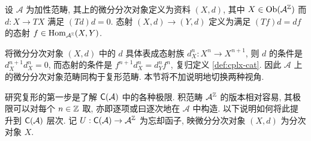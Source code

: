 \begin{definition}[微分分次对象]
	设 $\mathcal{A}$ 为加性范畴, 其上的微分分次对象定义为资料 $(X, d)$, 其中 $X \in \operatorname{Ob}(\mathcal{A}^{\mathbb{Z}})$ 而 $d: X \to TX$ 满足 $(Td)d = 0$. 态射 $(X,d) \to (Y,d)$ 定义为满足 $(Tf) d = df$ 的态射 $f \in \operatorname{Hom}_{\mathcal{A}^{\mathbb{Z}}}(X, Y)$.
\end{definition}

将微分分次对象 $(X, d)$ 中的 $d$ 具体表成态射族 $d_X^n: X^n \to X^{n+1}$, 则 $d$ 的条件是 $d_X^{n+1} d_X^n = 0$, 而态射的条件是 $f^{n+1} d^n_X = d^n_Y f^n$, 复归定义 \ref{def:cplx-cat}. 因此 $\mathcal{A}$ 上的微分分次对象范畴同构于复形范畴. 本节将不加说明地切换两种视角.

研究复形的第一步是了解 $\mathsf{C}(\mathcal{A})$ 中的各种极限. 积范畴 $\mathcal{A}^{\mathbb{Z}}$ 的版本相对容易, 其极限可以对每个 $n \in \mathbb{Z}$ 取, 亦即逐项或曰逐次地在 $\mathcal{A}$ 中构造. 以下说明如何将此提升到 $\mathsf{C}(\mathcal{A})$ 层次. 记 $U: \mathsf{C}(\mathcal{A}) \to \mathcal{A}^{\mathbb{Z}}$ 为忘却函子, 映微分分次对象 $(X,d)$ 为分次对象 $X$.

